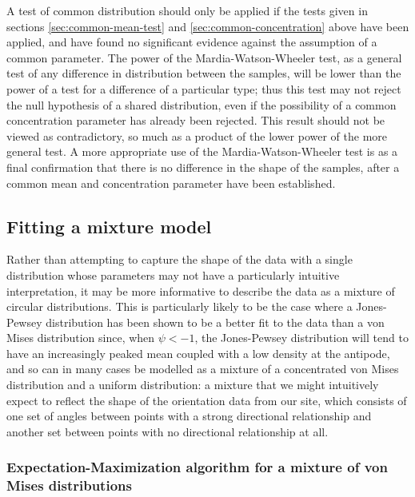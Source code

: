 \documentclass[../../ArchStats.tex]{subfiles}
\begin{document}
A test of common distribution should only be applied if the tests given in sections \ref{sec:common-mean-test} and \ref{sec:common-concentration} above have been applied, and have found no significant evidence against the assumption of a common parameter. The power of the Mardia-Watson-Wheeler test, as a general test of any difference in distribution between the samples, will be lower than the power of a test for a difference of a particular type; thus this test may not reject the null hypothesis of a shared distribution, even if the possibility of a common concentration parameter has already been rejected. This result should not be viewed as contradictory, so much as a product of the lower power of the more general test. A more appropriate use of the Mardia-Watson-Wheeler test is as a final confirmation that there is no difference in the shape of the samples, after a common mean and concentration parameter have been established.





\subsection{Fitting a mixture model}

Rather than attempting to capture the shape of the data with a single distribution whose parameters may not have a particularly intuitive interpretation,  it may be more informative to describe the data as a mixture of circular distributions.  This is particularly likely to be the case where a Jones-Pewsey distribution has been shown to be a better fit to the data than a von Mises distribution  since, when $\psi < -1$, the Jones-Pewsey distribution will tend to have an increasingly peaked mean coupled with a low density at the antipode, and so can in many cases be modelled as a mixture of a concentrated von Mises distribution and a uniform distribution: a mixture that we might intuitively expect to reflect the shape of the orientation data from our site, which consists of one set of angles between points with a strong directional relationship and another set between points with no directional relationship at all.


\subsubsection{Expectation-Maximization algorithm for a mixture of von Mises distributions}
\end{document}
